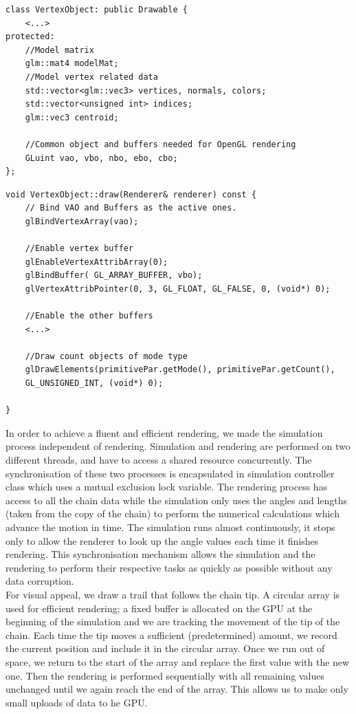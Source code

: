 \documentclass[paper=a4, fontsize=11pt]{scrartcl} %
\numberwithin{equation}{section} %
\numberwithin{figure}{section} %
\numberwithin{table}{section} %
\begin{document}
\begin{lstlisting}[float,caption=Drawable Class., label={lst:drawable}]
class VertexObject: public Drawable {
	<...>
protected:
	//Model matrix
	glm::mat4 modelMat;
	//Model vertex related data
	std::vector<glm::vec3> vertices, normals, colors;
	std::vector<unsigned int> indices;
	glm::vec3 centroid;

	//Common object and buffers needed for OpenGL rendering
	GLuint vao, vbo, nbo, ebo, cbo;
};
\end{lstlisting}


\begin{lstlisting}[float,caption=Common draw call for all VertexObjects., label={lst:draw}]
void VertexObject::draw(Renderer& renderer) const {
	// Bind VAO and Buffers as the active ones.
	glBindVertexArray(vao);

	//Enable vertex buffer
	glEnableVertexAttribArray(0);
	glBindBuffer( GL_ARRAY_BUFFER, vbo);
	glVertexAttribPointer(0, 3, GL_FLOAT, GL_FALSE, 0, (void*) 0);
	
	//Enable the other buffers 
	<...>
		
	//Draw count objects of mode type
	glDrawElements(primitivePar.getMode(), primitivePar.getCount(),
	GL_UNSIGNED_INT, (void*) 0);
	
}
\end{lstlisting}

In order to achieve a fluent and efficient rendering, we made the simulation process independent of rendering. Simulation and rendering are performed on two different threads, and have to access a shared resource concurrently. The synchronisation of these two processes is encapsulated in simulation controller class which uses a mutual exclusion lock variable. The rendering process has access to all the chain data while the simulation only uses the angles and lengths (taken from the copy of the chain) to perform the numerical calculations which advance the motion in time. The simulation runs almost continuously, it stops only to allow the renderer to look up the angle values each time it finishes rendering. This synchronisation mechanism allows the simulation and the rendering to perform their respective tasks as quickly as possible without any data corruption. \\

For visual appeal, we draw a trail that follows the chain tip. A circular array is used for efficient rendering; a fixed buffer is allocated on the GPU at the beginning of the simulation and we are tracking the movement of the tip of the chain. Each time the tip moves a sufficient (predetermined) amount, we record the current position and include it in the circular array. Once we run out of space, we return to the start of the array and replace the first value with the new one. Then the rendering is performed sequentially with all remaining values unchanged until we again reach the end of the array. This allows us to make only small uploads of data to he GPU. \\
\end{document}
